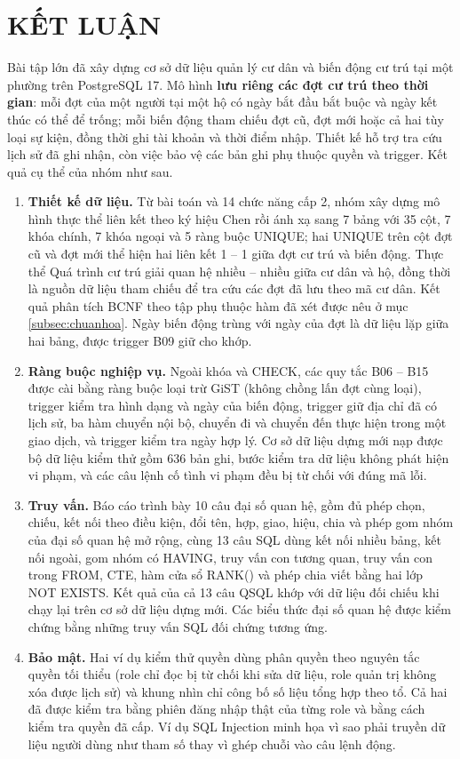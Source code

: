\section*{KẾT LUẬN}
\label{sec:ketluan}

Bài tập lớn đã xây dựng cơ sở dữ liệu quản lý cư dân và biến động cư trú tại một phường trên PostgreSQL 17. Mô hình \textbf{lưu riêng các đợt cư trú theo thời gian}: mỗi đợt của một người tại một hộ có ngày bắt đầu bắt buộc và ngày kết thúc có thể để trống; mỗi biến động tham chiếu đợt cũ, đợt mới hoặc cả hai tùy loại sự kiện, đồng thời ghi tài khoản và thời điểm nhập. Thiết kế hỗ trợ tra cứu lịch sử đã ghi nhận, còn việc bảo vệ các bản ghi phụ thuộc quyền và trigger. Kết quả cụ thể của nhóm như sau.

\begin{enumerate}[leftmargin=*]
    \item \textbf{Thiết kế dữ liệu.} Từ bài toán và 14 chức năng cấp 2, nhóm xây dựng mô hình thực thể liên kết theo ký hiệu Chen rồi ánh xạ sang 7 bảng với 35 cột, 7 khóa chính, 7 khóa ngoại và 5 ràng buộc UNIQUE; hai UNIQUE trên cột đợt cũ và đợt mới thể hiện hai liên kết 1 -- 1 giữa đợt cư trú và biến động. Thực thể Quá trình cư trú giải quan hệ nhiều -- nhiều giữa cư dân và hộ, đồng thời là nguồn dữ liệu tham chiếu để tra cứu các đợt đã lưu theo mã cư dân. Kết quả phân tích BCNF theo tập phụ thuộc hàm đã xét được nêu ở mục \ref{subsec:chuanhoa}. Ngày biến động trùng với ngày của đợt là dữ liệu lặp giữa hai bảng, được trigger B09 giữ cho khớp.
    \item \textbf{Ràng buộc nghiệp vụ.} Ngoài khóa và CHECK, các quy tắc B06 -- B15 được cài bằng ràng buộc loại trừ GiST (không chồng lấn đợt cùng loại), trigger kiểm tra hình dạng và ngày của biến động, trigger giữ địa chỉ đã có lịch sử, ba hàm chuyển nội bộ, chuyển đi và chuyển đến thực hiện trong một giao dịch, và trigger kiểm tra ngày hợp lý. Cơ sở dữ liệu dựng mới nạp được bộ dữ liệu kiểm thử gồm 636 bản ghi, bước kiểm tra dữ liệu không phát hiện vi phạm, và các câu lệnh cố tình vi phạm đều bị từ chối với đúng mã lỗi.
    \item \textbf{Truy vấn.} Báo cáo trình bày 10 câu đại số quan hệ, gồm đủ phép chọn, chiếu, kết nối theo điều kiện, đổi tên, hợp, giao, hiệu, chia và phép gom nhóm của đại số quan hệ mở rộng, cùng 13 câu SQL dùng kết nối nhiều bảng, kết nối ngoài, gom nhóm có HAVING, truy vấn con tương quan, truy vấn con trong FROM, CTE, hàm cửa sổ RANK() và phép chia viết bằng hai lớp NOT EXISTS. Kết quả của cả 13 câu QSQL khớp với dữ liệu đối chiếu khi chạy lại trên cơ sở dữ liệu dựng mới. Các biểu thức đại số quan hệ được kiểm chứng bằng những truy vấn SQL đối chứng tương ứng.
    \item \textbf{Bảo mật.} Hai ví dụ kiểm thử quyền dùng phân quyền theo nguyên tắc quyền tối thiểu (role chỉ đọc bị từ chối khi sửa dữ liệu, role quản trị không xóa được lịch sử) và khung nhìn chỉ công bố số liệu tổng hợp theo tổ. Cả hai đã được kiểm tra bằng phiên đăng nhập thật của từng role và bằng cách kiểm tra quyền đã cấp. Ví dụ SQL Injection minh họa vì sao phải truyền dữ liệu người dùng như tham số thay vì ghép chuỗi vào câu lệnh động.
\end{enumerate}

